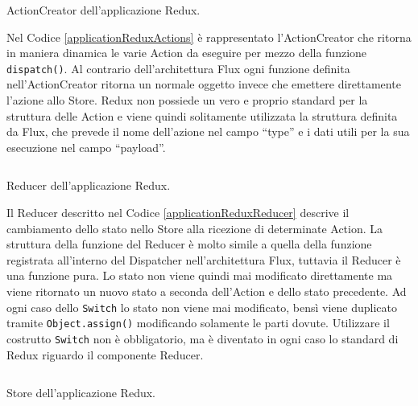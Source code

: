 \begin{listing}[ht]
\inputminted{javascript}{sources/applicationReduxActions.js}
\caption{ActionCreator dell'applicazione Redux.} 
\label{applicationReduxActions} 
\end{listing}

Nel Codice \ref{applicationReduxActions} è rappresentato l'ActionCreator che ritorna in maniera dinamica le varie Action da eseguire per mezzo della funzione \texttt{dispatch()}. Al contrario dell'architettura Flux ogni funzione definita nell'ActionCreator ritorna un normale oggetto invece che emettere direttamente l'azione allo Store.
Redux non possiede un vero e proprio standard per la struttura delle Action e viene quindi solitamente utilizzata la struttura definita da Flux, che prevede il nome dell'azione nel campo “type” e i dati utili per la sua esecuzione nel campo “payload”.

\begin{listing}[ht]
\inputminted{javascript}{sources/applicationReduxReducer.js}
\caption{Reducer dell'applicazione Redux.} 
\label{applicationReduxReducer} 
\end{listing}

Il Reducer descritto nel Codice \ref{applicationReduxReducer} descrive il cambiamento dello stato nello Store alla ricezione di determinate Action. La struttura della funzione del Reducer è molto simile a quella della funzione registrata all'interno del Dispatcher nell'architettura Flux, tuttavia il Reducer è una funzione pura. Lo stato non viene quindi mai modificato direttamente ma viene ritornato un nuovo stato a seconda dell'Action e dello stato precedente.
Ad ogni caso dello \texttt{Switch} lo stato non viene mai modificato, bensì viene duplicato tramite \texttt{Object.assign()} modificando solamente le parti dovute.
Utilizzare il costrutto \texttt{Switch} non è obbligatorio, ma è diventato in ogni caso lo standard di Redux riguardo il componente Reducer. 

\begin{listing}[ht]
\inputminted{javascript}{sources/applicationReduxStore.js}
\caption{Store dell'applicazione Redux.} 
\label{applicationReduxStore} 
\end{listing}

